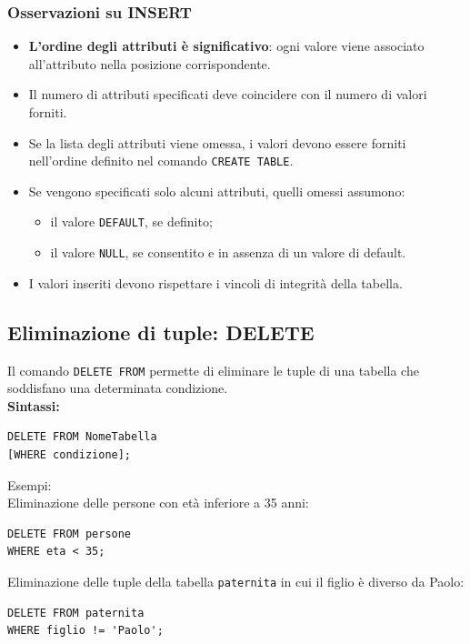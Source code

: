 \subsubsection*{Osservazioni su INSERT}
\begin{itemize}
    \item \textbf{L'ordine degli attributi è significativo}: ogni valore viene associato all'attributo nella posizione corrispondente.

    \item Il numero di attributi specificati deve coincidere con il numero di valori forniti.

    \item Se la lista degli attributi viene omessa, i valori devono essere forniti nell'ordine definito nel comando \texttt{CREATE TABLE}.

    \item Se vengono specificati solo alcuni attributi, quelli omessi assumono:
    \begin{itemize}
        \item il valore \texttt{DEFAULT}, se definito;
        \item il valore \texttt{NULL}, se consentito e in assenza di un valore di default.
    \end{itemize}

    \item I valori inseriti devono rispettare i vincoli di integrità della tabella.
\end{itemize}

\subsection{Eliminazione di tuple: DELETE}
Il comando \texttt{DELETE FROM} permette di eliminare le tuple di una tabella che soddisfano una determinata condizione.\\
\textbf{Sintassi:}
\begin{verbatim}
DELETE FROM NomeTabella
[WHERE condizione];
\end{verbatim}
\textcolor{verdeEsempio}{Esempi:}\\
Eliminazione delle persone con età inferiore a 35 anni:
\begin{verbatim}
DELETE FROM persone
WHERE eta < 35;
\end{verbatim}
\noindent Eliminazione delle tuple della tabella \texttt{paternita} in cui il figlio è diverso da Paolo:
\begin{verbatim}
DELETE FROM paternita
WHERE figlio != 'Paolo';
\end{verbatim}
